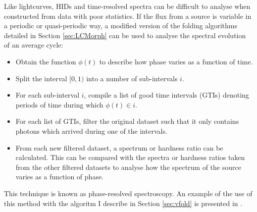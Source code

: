 \par Like lightcurves, HIDs and time-resolved spectra can be difficult to analyse when constructed from data with poor statistics.  If the flux from a source is variable in a periodic or quasi-periodic way, a modified version of the folding algorithms detailed in Section \ref{sec:LCMorph} can be used to analyse the spectral evolution of an average cycle:
\begin{itemize}
\item Obtain the function $\phi(t)$ to describe how phase varies as a function of time.
\item Split the interval $[0,1)$ into a number of sub-intervals $i$.
\item For each sub-interval $i$, compile a list of good time intervals (GTIs) denoting periods of time during which $\phi(t)\in i$.
\item For each list of GTIs, filter the original dataset such that it only contains photons which arrived during one of the intervals.
\item From each new filtered dataset, a spectrum or hardness ratio can be calculated.  This can be compared with the spectra or hardness ratios taken from the other filtered datasets to analyse how the spectrum of the source varies as a function of phase.
\end{itemize}
This technique is known as phase-resolved spectroscopy.  An example of the use of this method with the algoritm I describe in Section \ref{sec:vfold} is presented in \citet{Wang_Reflect}.



